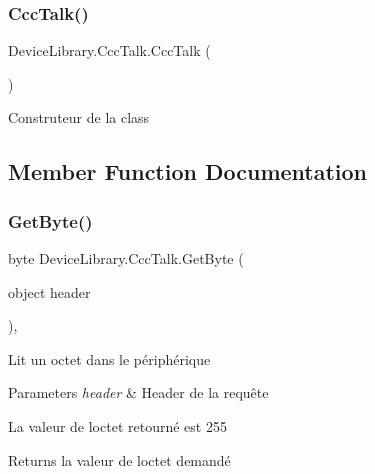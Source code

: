 \subsubsection{\texorpdfstring{Ccc\+Talk()}{CccTalk()}}
{\footnotesize\ttfamily Device\+Library.\+Ccc\+Talk.\+Ccc\+Talk (\begin{DoxyParamCaption}{ }\end{DoxyParamCaption})\hspace{0.3cm}{\ttfamily [inline]}}



Construteur de la class 



\subsection{Member Function Documentation}
\mbox{\label{class_device_library_1_1_ccc_talk_a5f67f62cb03d573225712813348408ad}} 
\subsubsection{\texorpdfstring{Get\+Byte()}{GetByte()}}
{\footnotesize\ttfamily byte Device\+Library.\+Ccc\+Talk.\+Get\+Byte (\begin{DoxyParamCaption}\item[{object}]{header }\end{DoxyParamCaption})\hspace{0.3cm}{\ttfamily [inline]}, {\ttfamily [protected]}}



Lit un octet dans le périphérique 


\begin{DoxyParams}{Parameters}
{\em header} & Header de la requête\\
\hline
\end{DoxyParams}


La valeur de l\textquotesingle{}octet retourné est 255

\begin{DoxyReturn}{Returns}
la valeur de l\textquotesingle{}octet demandé
\end{DoxyReturn}
\mbox{\label{class_device_library_1_1_ccc_talk_ab986f5ca49ce60e90442b54682f34b62}} 
